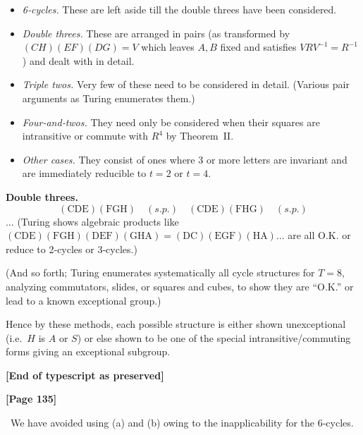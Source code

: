 \documentclass[12pt]{article}
\begin{document}
\begin{itemize}
\item {\em 6‐cycles.} These are left aside till the double threes have been considered.
\item {\em Double threes.} These are arranged in pairs (as transformed by $(CH)(EF)(DG) = V$ which leaves $A,B$ fixed and satisfies $V R V^{-1} = R^{-1}$) and dealt with in detail.
\item {\em Triple twos.} Very few of these need to be considered in detail. (Various pair arguments as Turing enumerates them.)
\item {\em Four‐and‐twos.} They need only be considered when their squares are intransitive or commute with $R^4$ by Theorem~II.
\item {\em Other cases.} They consist of ones where 3 or more letters are invariant and are immediately reducible to $t=2$ or $t=4$.
\end{itemize}

\noindent
{\bf Double threes.}  
\[
(\mathrm{CDE})(\mathrm{FGH}) \quad (s.\!p.) \quad (\mathrm{CDE})(\mathrm{FHG}) \quad (s.\!p.)
\]
$\dots$ (Turing shows algebraic products like $(\mathrm{CDE})(\mathrm{FGH})(\mathrm{DEF})(\mathrm{GHA}) = (\mathrm{DC})(\mathrm{EGF})(\mathrm{HA}) \dots$ are all O.K. or reduce to 2‐cycles or 3‐cycles.)

\smallskip

(And so forth; Turing enumerates systematically all cycle structures for $T=8$, analyzing commutators, slides, or squares and cubes, to show they are “O.K.” or lead to a known exceptional group.)

\bigskip

Hence by these methods, each possible structure is either shown unexceptional (i.e.\ $H$ is $A$ or $S$) or else shown to be one of the special intransitive/commuting forms giving an exceptional subgroup.

\bigskip

\begin{center}
{\bf [End of typescript as preserved]}
\end{center}


\bigskip
\noindent
{\bf [Page 135]}

\smallskip

\noindent
\textellipsis\ We have avoided using (a) and (b) owing to the inapplicability for the 6‐cycles.
\end{document}
